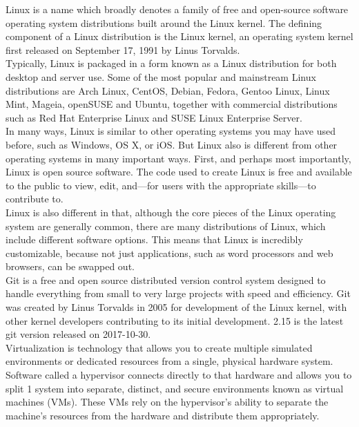 \documentclass[a4paper,12pt]{report}
\begin{document}
Linux is a name which broadly denotes a family of free and open-source software operating system distributions built around the Linux kernel. The defining component of a Linux distribution is the Linux kernel, an operating system kernel first released on September 17, 1991 by Linus Torvalds.\\
\newline
Typically, Linux is packaged in a form known as a Linux distribution for both desktop and server use. Some of the most popular and mainstream Linux distributions are Arch Linux, CentOS, Debian, Fedora, Gentoo Linux, Linux Mint, Mageia, openSUSE and Ubuntu, together with commercial distributions such as Red Hat Enterprise Linux and SUSE Linux Enterprise Server.\\
\newline
In many ways, Linux is similar to other operating systems you may have used before, such as Windows, OS X, or iOS. But Linux also is different from other operating systems in many important ways. First, and perhaps most importantly, Linux is open source software. The code used to create Linux is free and available to the public to view, edit, and—for users with the appropriate skills—to contribute to.\\
\newline
Linux is also different in that, although the core pieces of the Linux operating system are generally common, there are many distributions of Linux, which include different software options. This means that Linux is incredibly customizable, because not just applications, such as word processors and web browsers, can be swapped out.\\
\newline
Git is a free and open source distributed version control system designed to handle everything from small to very large projects with speed and efficiency. Git was created by Linus Torvalds in 2005 for development of the Linux kernel, with other kernel developers contributing to its initial development. 2.15 is the latest git version released on 2017-10-30.\\
\newline
Virtualization is technology that allows you to create multiple simulated environments or dedicated resources from a single, physical hardware system. Software called a hypervisor connects directly to that hardware and allows you to split 1 system into separate, distinct, and secure environments known as virtual machines (VMs). These VMs rely on the hypervisor’s ability to separate the machine’s resources from the hardware and distribute them appropriately.\\
\end{document}
